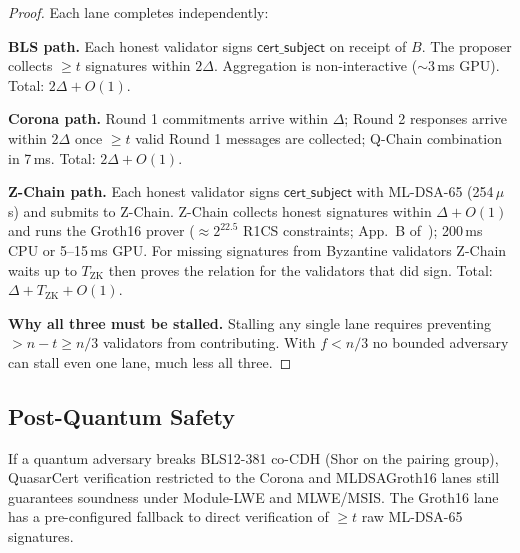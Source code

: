 \begin{proof}
Each lane completes independently:

\textbf{BLS path.} Each honest validator signs $\mathsf{cert\_subject}$
on receipt of $B$. The proposer collects $\geq t$ signatures within
$2\Delta$. Aggregation is non-interactive (${\sim}3$\,ms GPU).
Total: $2\Delta + O(1)$.

\textbf{Corona path.} Round 1 commitments arrive within $\Delta$;
Round 2 responses arrive within $2\Delta$ once $\geq t$ valid Round 1
messages are collected; Q-Chain combination in 7\,ms.
Total: $2\Delta + O(1)$.

\textbf{Z-Chain path.} Each honest validator signs
$\mathsf{cert\_subject}$ with ML-DSA-65 (254\,$\mu$s) and submits to
Z-Chain. Z-Chain collects honest signatures within $\Delta + O(1)$ and
runs the Groth16 prover ($\approx 2^{22.5}$ R1CS constraints; App.~B
of~\cite{qcert-proof}); 200\,ms CPU or 5--15\,ms GPU. For missing
signatures from Byzantine validators Z-Chain waits up to
$T_{\mathrm{ZK}}$ then proves the relation for the validators that did
sign.
Total: $\Delta + T_{\mathrm{ZK}} + O(1)$.

\textbf{Why all three must be stalled.} Stalling any single lane
requires preventing $> n - t \geq n/3$ validators from contributing.
With $f < n/3$ no bounded adversary can stall even one lane, much less
all three.
\end{proof}

\subsection{Post-Quantum Safety}

\begin{theorem}
\label{thm:pq-safety}
If a quantum adversary breaks BLS12-381 co-CDH (Shor on the pairing
group), QuasarCert verification restricted to the Corona and
MLDSAGroth16 lanes still guarantees soundness under Module-LWE and
MLWE/MSIS. The Groth16 lane has a pre-configured fallback to direct
verification of $\geq t$ raw ML-DSA-65 signatures.
\end{theorem}

